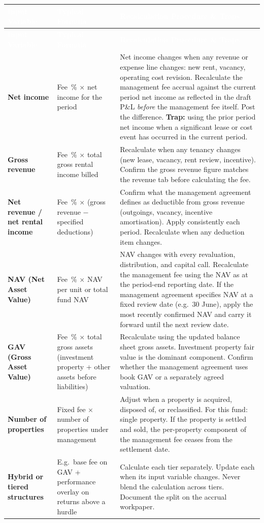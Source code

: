 \documentclass[10pt,a4paper]{article}
\begin{document}
{\small\sffamily
\begin{longtable}{@{} L{3.0cm} L{2.2cm} L{7.5cm} @{}}
\textcolor{white}{\bfseries Input Variable} & \textcolor{white}{\bfseries Typical Formula} & \textcolor{white}{\bfseries Recalculation Procedure \& Traps} \\
\midrule
\endfirsthead
{}\textcolor{white}{\bfseries Input Variable} & \textcolor{white}{\bfseries Typical Formula} & \textcolor{white}{\bfseries Recalculation Procedure \& Traps} \\
\midrule
\endhead
\textbf{Net income} & Fee~\% $\times$ net income for the period & Net income changes when any revenue or expense line changes: new rent, vacancy, operating cost revision. Recalculate the management fee accrual against the current period net income as reflected in the draft P\&L \emph{before} the management fee itself. Post the difference. \textbf{Trap:} using the prior period net income when a significant lease or cost event has occurred in the current period. \\
\textbf{Gross revenue} & Fee~\% $\times$ total gross rental income billed & Recalculate when any tenancy changes (new lease, vacancy, rent review, incentive). Confirm the gross revenue figure matches the revenue tab before calculating the fee. \\
\textbf{Net revenue / net rental income} & Fee~\% $\times$ (gross revenue $-$ specified deductions) & Confirm what the management agreement defines as deductible from gross revenue (outgoings, vacancy, incentive amortisation). Apply consistently each period. Recalculate when any deduction item changes. \\
\textbf{NAV (Net Asset Value)} & Fee~\% $\times$ NAV per unit or total fund NAV & NAV changes with every revaluation, distribution, and capital call. Recalculate the management fee using the NAV as at the period-end reporting date. If the management agreement specifies NAV at a fixed review date (e.g.\ 30 June), apply the most recently confirmed NAV and carry it forward until the next review date. \\
\textbf{GAV (Gross Asset Value)} & Fee~\% $\times$ total gross assets (investment property + other assets before liabilities) & Recalculate using the updated balance sheet gross assets. Investment property fair value is the dominant component. Confirm whether the management agreement uses book GAV or a separately agreed valuation. \\
\textbf{Number of properties} & Fixed fee $\times$ number of properties under management & Adjust when a property is acquired, disposed of, or reclassified. For this fund: single property. If the property is settled and sold, the per-property component of the management fee ceases from the settlement date. \\
\textbf{Hybrid or tiered structures} & E.g.\ base fee on GAV + performance overlay on returns above a hurdle & Calculate each tier separately. Update each when its input variable changes. Never blend the calculation across tiers. Document the split on the accrual workpaper. \\
\bottomrule
\end{longtable}}
\end{document}
